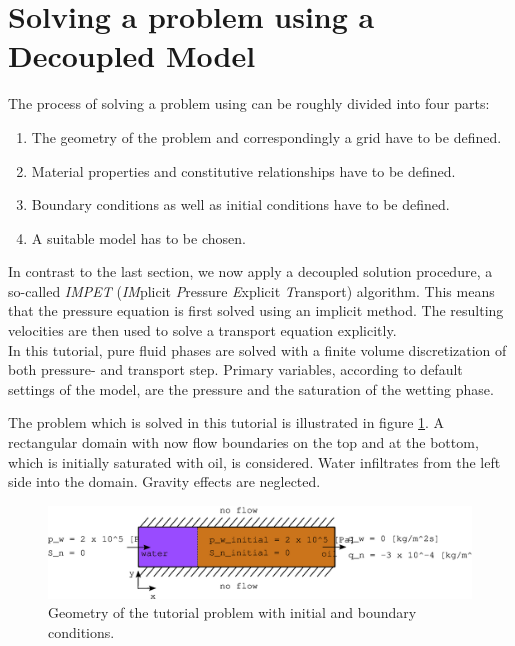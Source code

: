 \section[Decoupled model]{Solving a problem using a Decoupled Model}\label{tutorial-decoupled}
The process of solving a problem using \Dumux can be roughly divided into four parts: 
\begin{enumerate}
 \item The geometry of the problem and correspondingly a grid have to be defined.
 \item Material properties and constitutive relationships have to be defined.
 \item Boundary conditions as well as initial conditions have to be defined.
 \item A suitable model has to be chosen.
\end{enumerate}

In contrast to the last section, we now apply a decoupled solution procedure, a
so-called \textit{IMPET} (\textit{IM}plicit \textit{P}ressure \textit{E}xplicit 
\textit{T}ransport) algorithm. This means that the pressure equation is first 
solved using an implicit method. The resulting velocities are then used to solve
a transport equation explicitly.\\
In this tutorial, pure fluid phases are solved with a finite volume discretization
of both pressure- and transport step. Primary variables, according to default
settings of the model, are the pressure and the saturation of the wetting phase.

The problem which is solved in this tutorial is illustrated in figure 
\ref{tutorial-decoupled:problemfigure}. A rectangular domain with now flow 
boundaries on the top and at the bottom, which is initially saturated with oil, 
is considered. Water infiltrates from the left side into the domain. Gravity 
effects are neglected.

\begin{figure}[ht]
\centering
\includegraphics[width=0.9\linewidth,keepaspectratio]{EPS/tutorial-problemconfiguration}
\caption{Geometry of the tutorial problem with initial and boundary conditions.}\label{tutorial-decoupled:problemfigure}
\end{figure}

